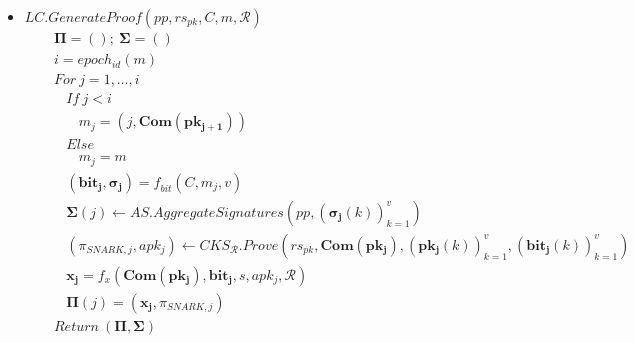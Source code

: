 \begin{itemize}
\item $\mathit{LC.GenerateProof}(\mathit{pp}, \mathit{rs_{\mathit{pk}}}, C, m, \mathcal{R})$
\begin{align*}
&\ \ \ \ \mathbf{\Pi} = (); \ \mathbf{\Sigma} = () \\
&\ \ \ \ i = \mathit{epoch_{id}}(m) \\
&\ \ \ \ \mathit{For} \ j = 1, \ldots, i \\
&\ \ \ \ \ \ \ \ \mathit{If} \  j < i  \\
&\ \ \ \ \ \ \ \ \ \ \ \ \mathit{m_j}= (j,\mathbf{Com}(\mathbf{pk_{j+1}})) \\
&\ \ \ \ \ \ \ \ \mathit{Else} \\
&\ \ \ \ \ \ \ \ \ \ \ \ \mathit{m_j} = m  \\
&\ \ \ \ \ \ \ \ (\mathbf{bit_j}, \mathbf{\sigma_j}) = \mathit{f_{bit}}(C, m_j, v) \\
&\ \ \ \ \ \ \ \ \mathbf{\Sigma}(j) \leftarrow \mathit{AS.AggregateSignatures}(\mathit{pp}, (\mathbf{\sigma_j}(k))_{k=1}^v) \\ 
&\ \ \ \ \ \ \ \ (\mathit{\pi_{\mathit{SNARK},j}}, \mathit{apk_j}) \leftarrow \mathit{CKS_{\mathcal{R}}.Prove}(\mathit{rs}_{pk}, \mathbf{Com}(\mathbf{pk_{j}}), (\mathbf{pk_{j}}(k))_{k=1}^{v}, (\mathbf{bit_j}(k))_{k=1}^{v})\\
&\ \ \ \ \ \ \ \ \mathbf{x_j} = f_x(\mathbf{Com}(\mathbf{pk_j}), \mathbf{bit_j}, s,  \mathit{apk_{j}}, \mathcal{R}) \\
&\ \ \ \ \ \ \ \ \mathbf{\Pi}(j) = (\mathbf{x_j}, \mathit{\pi_{\mathit{SNARK}, j}}) \\
&\ \ \ \ \mathit{Return} \ (\mathbf{\Pi}, \mathbf{\Sigma})  
\end{align*}
\end{itemize}
